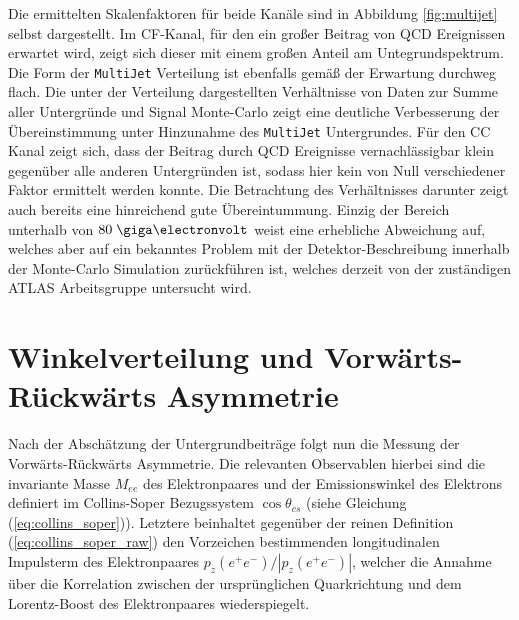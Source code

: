 Die ermittelten Skalenfaktoren für beide Kanäle sind in Abbildung
\ref{fig:multijet} selbst dargestellt. Im \ac{CF}-Kanal, für den ein großer
Beitrag von \ac{QCD} Ereignissen erwartet wird, zeigt sich dieser mit einem
großen Anteil am Untegrundspektrum. Die Form der \texttt{MultiJet} Verteilung
ist ebenfalls gemäß der Erwartung durchweg flach. Die unter der Verteilung
dargestellten Verhältnisse von Daten zur Summe aller Untergründe und
Signal Monte-Carlo zeigt eine deutliche Verbesserung der Übereinstimmung unter
Hinzunahme des \texttt{MultiJet} Untergrundes. Für den \ac{CC} Kanal zeigt
sich, dass der Beitrag durch \ac{QCD} Ereignisse vernachlässigbar klein
gegenüber alle anderen Untergründen ist, sodass hier kein von Null
verschiedener Faktor ermittelt werden konnte. Die Betrachtung des Verhältnisses
darunter zeigt auch bereits eine hinreichend gute Übereintummung.  Einzig der
Bereich unterhalb von $80\GeV$ weist eine erhebliche Abweichung auf, welches
aber auf ein bekanntes Problem mit der Detektor-Beschreibung innerhalb der
Monte-Carlo Simulation zurückführen ist, welches derzeit von der zuständigen
ATLAS Arbeitsgruppe untersucht wird.



\section{Winkelverteilung und Vorwärts-Rückwärts Asymmetrie}
\label{afb:afb}


Nach der Abschätzung der Untergrundbeiträge folgt nun die Messung der
Vorwärts-Rückwärts Asymmetrie. Die relevanten Observablen hierbei sind die
invariante Masse $M_{ee}$ des Elektronpaares und der Emissionswinkel des
Elektrons definiert im Collins-Soper Bezugssystem $\cos\theta_{cs}$ (siehe
Gleichung (\ref{eq:collins_soper})). Letztere beinhaltet gegenüber der reinen
Definition (\ref{eq:collins_soper_raw}) den Vorzeichen bestimmenden
longitudinalen Impulsterm des Elektronpaares $p_z(e^+e^-)/|p_z(e^+e^-)|$,
welcher die Annahme über die Korrelation zwischen der ursprünglichen
Quarkrichtung und dem Lorentz-Boost des Elektronpaares wiederspiegelt. 



